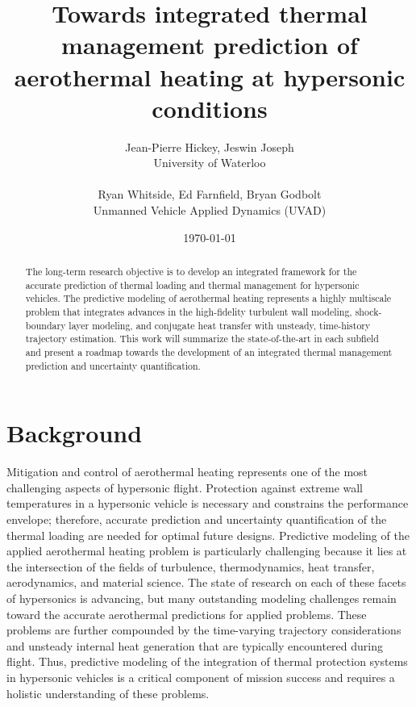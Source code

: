 \documentclass [11pt, fancyhdr, twoside] {article}
\begin{document}
\title{Towards integrated thermal management prediction of aerothermal heating at hypersonic conditions}
\author {Jean-Pierre Hickey, Jeswin Joseph\\ University of Waterloo \\ \\
Ryan Whitside, Ed Farnfield, Bryan Godbolt\\
Unmanned Vehicle Applied Dynamics (UVAD)}

\date{\today}

\maketitle
\begin{abstract}
The long-term research objective is to develop an integrated framework for the accurate prediction of thermal loading and thermal management for hypersonic vehicles. The predictive modeling of aerothermal heating represents a highly multiscale problem that integrates advances in the high-fidelity turbulent wall modeling, shock-boundary layer modeling, and conjugate heat transfer with unsteady, time-history trajectory estimation. This work will summarize the state-of-the-art in each subfield and present a roadmap towards the development of an integrated thermal management prediction and uncertainty quantification. 
\end{abstract}

\section{Background}
Mitigation and control of aerothermal heating represents one of the most challenging aspects of hypersonic flight. Protection against extreme wall temperatures in a hypersonic vehicle is necessary and constrains the performance envelope; therefore, accurate prediction and uncertainty quantification of the thermal loading are needed for optimal future designs. Predictive modeling of the applied aerothermal heating problem is particularly challenging because it lies at the intersection of the fields of turbulence, thermodynamics, heat transfer, aerodynamics, and material science. The state of research on each of these facets of hypersonics is advancing, but many outstanding modeling challenges remain toward the accurate aerothermal predictions for applied problems. These problems are further compounded by the time-varying trajectory considerations and unsteady internal heat generation that are typically encountered during flight. Thus, predictive modeling of the integration of thermal protection systems in hypersonic vehicles is a critical component of mission success and requires a holistic understanding of these problems.
\end{document}
